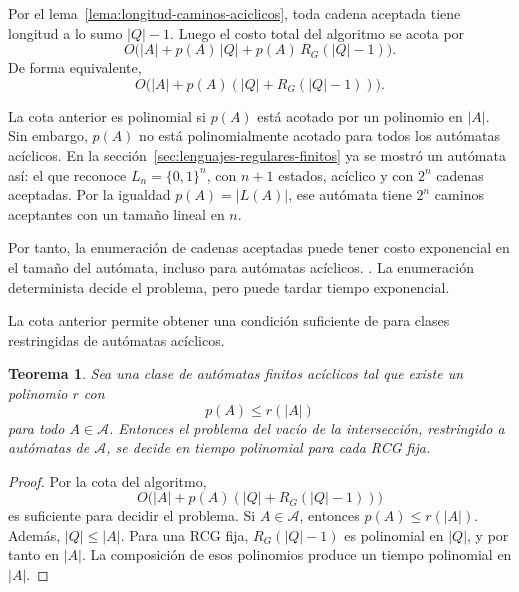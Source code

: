 \documentclass{report}
\theoremstyle{definition}
\theoremstyle{plain}
\newtheorem{teorema}{Teorema}[chapter]
\theoremstyle{remark}
\begin{document}
Por el lema~\ref{lema:longitud-caminos-aciclicos}, toda cadena aceptada
tiene longitud a lo sumo $|Q|-1$. Luego el costo total del algoritmo se
acota por
\[
  O\bigl( |A| + p(A)\,|Q| + p(A)\,R_G(|Q|-1) \bigr).
\]
De forma equivalente,
\[
  O\bigl( |A| + p(A)(|Q| + R_G(|Q|-1)) \bigr).
\]

La cota anterior es polinomial si $p(A)$ está acotado por un polinomio
en $|A|$. Sin embargo, $p(A)$ no está polinomialmente acotado para todos
los autómatas acíclicos. En la
sección~\ref{sec:lenguajes-regulares-finitos} ya se mostró un
autómata así: el que reconoce $L_n=\{0,1\}^n$, con $n+1$ estados,
acíclico y con $2^n$ cadenas aceptadas. Por la igualdad $p(A)=|L(A)|$,
ese autómata tiene $2^n$ caminos aceptantes con un tamaño lineal en $n$.

Por tanto, la enumeración de cadenas aceptadas puede tener
costo exponencial en el tamaño del autómata, incluso para autómatas
acíclicos. . La enumeración
determinista decide el problema, pero puede tardar tiempo exponencial.

La cota anterior permite obtener una condición suficiente de
 para clases restringidas de autómatas acíclicos.

\begin{teorema}
  \label{teo:clases-pol-caminos}
  Sea  una clase de autómatas finitos acíclicos tal que
  existe un polinomio $r$ con
  \[
    p(A) \le r(|A|)
  \]
  para todo $A \in \mathcal{A}$. Entonces el problema del vacío de la
  intersección, restringido a autómatas de $\mathcal{A}$, se decide en
  tiempo polinomial para cada RCG fija.
\end{teorema}

\begin{proof}
  Por la cota del algoritmo,
  \[
    O\bigl( |A| + p(A)(|Q| + R_G(|Q|-1)) \bigr)
  \]
  es suficiente para decidir el problema. Si $A \in \mathcal{A}$,
  entonces $p(A) \le r(|A|)$.
  Además, $|Q| \le |A|$. Para una RCG fija, $R_G(|Q|-1)$ es polinomial en
  $|Q|$, y por tanto en $|A|$. La composición de esos polinomios produce
  un tiempo polinomial en $|A|$.
\end{proof}
\end{document}
